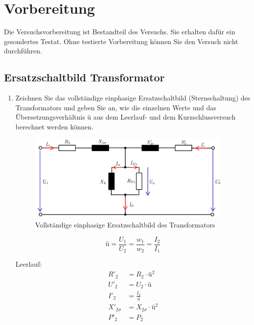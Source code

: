 \section{Vorbereitung}
 {Die Versuchsvorbereitung ist Bestandteil des Versuchs. Sie erhalten dafür ein gesondertes Testat.
  Ohne testierte Vorbereitung können Sie den Versuch nicht durchführen.}
\subsection{Ersatzschaltbild Transformator}
\begin{enumerate}[label=\alph*)]
  \item Zeichnen Sie das vollständige einphasige Ersatzschaltbild (Sternschaltung) des
        Transformators und geben Sie an, wie die einzelnen Werte und das
        Übersetzungsverhältnis ü aus dem Leerlauf- und dem Kurzschlussversuch berechnet
        werden können.
        \begin{figure}[h!]
          \begin{center}
            \includegraphics[width=0.95\textwidth]{img/2.1.1.1}
          \end{center}
          \caption{Vollständige einphasige Ersatzschaltbild des Transformators}\label{img:2.1.1.1}
        \end{figure}
        $$ü=\frac{U_1}{U_2}=\frac{w_1}{w_2}=\frac{I_2}{I_1}$$
        \begin{minipage}{0.5\textwidth}
          Leerlauf:
          \begin{align*}
            R'_2         & =R_2\cdot ü^2           \\
            U'_2         & =U_2\cdot ü             \\
            I'_2         & = \frac{I_2}{ü}         \\
            X'_{2\sigma} & = X_{2\sigma} \cdot ü^2 \\
            P'_2         & = P_2
          \end{align*}

\end{minipage}
\end{enumerate}
